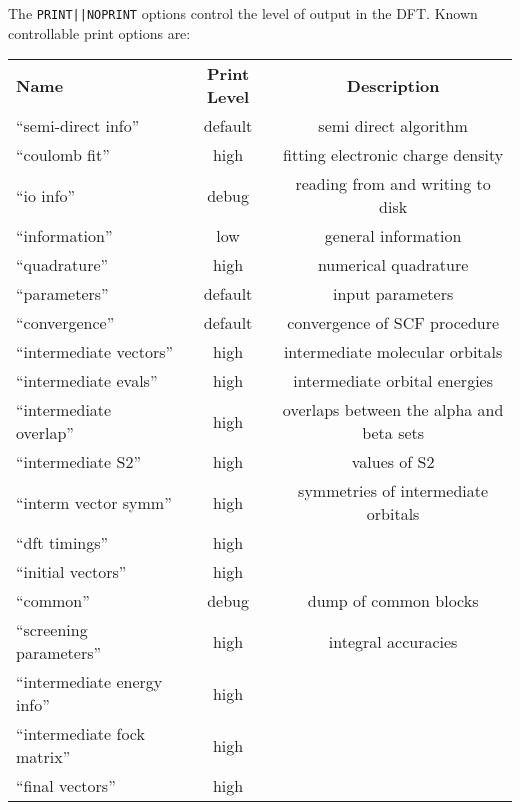 The \verb+PRINT||NOPRINT+ options control the level of output in the
DFT.  Known controllable print options are:

\begin{table}[htbp]
\begin{center}
\begin{tabular}{lcc}
  {\bf Name}          & {\bf Print Level} & {\bf Description} \\
 ``semi-direct info''               & default     & semi direct algorithm \\
 ``coulomb fit''                    & high        & fitting electronic charge density \\
 ``io info''                        & debug       & reading from and writing to disk  \\
 ``information''                    & low         & general information  \\
 ``quadrature''                     & high        & numerical quadrature  \\
 ``parameters''                     & default     & input parameters \\
 ``convergence''                    & default     & convergence of SCF procedure \\
 ``intermediate vectors''           & high        & intermediate molecular orbitals \\
 ``intermediate evals''             & high        & intermediate orbital energies \\
 ``intermediate overlap''           & high        & overlaps between the alpha and beta sets \\
 ``intermediate S2''                & high        & values of S2 \\
 ``interm vector symm''             & high        & symmetries of intermediate orbitals \\
 ``dft timings''                    & high        & \\
 ``initial vectors''                & high        & \\
 ``common''                         & debug       & dump of common blocks \\
 ``screening parameters''           & high        & integral accuracies \\
 ``intermediate energy info''       & high        & \\
 ``intermediate fock matrix''       & high        & \\
 ``final vectors''                  & high        & \\

\end{tabular}
\end{center}
\end{table}
